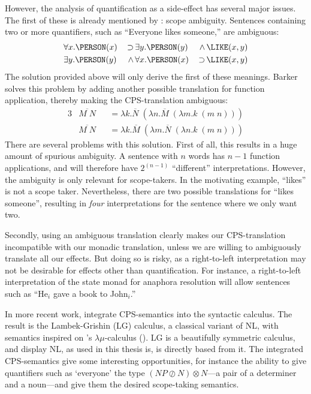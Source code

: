 However, the analysis of quantification as a side-effect has several
major issues. The first of these is already mentioned by
\citet{barker2004}: scope ambiguity. Sentences containing two or
more quantifiers, such as ``Everyone likes someone,'' are ambiguous:
\begin{alignat*}{3}
  &\forall x.\PERSON(x) \,&\supset \,&\exists y.\PERSON(y) \,&\wedge  \,&\LIKE(x,y)\\
  &\exists y.\PERSON(y) \,&\wedge  \,&\forall x.\PERSON(x) \,&\supset \,&\LIKE(x,y)
\end{alignat*}
The solution provided above will only derive the first of these
meanings. Barker solves this problem by adding another possible
translation for function application, thereby making the
CPS-translation ambiguous:
\begin{alignat*}{3}
  &\overline{M\;N} &&= \lambda k. \overline{N}\;(\lambda
  n.\overline{M}\;(\lambda m.k\;(m\;n)))\\
  &\overline{M\;N} &&= \lambda k. \overline{M}\;(\lambda
  m.\overline{N}\;(\lambda n.k\;(m\;n)))
\end{alignat*}
There are several problems with this solution. First of all, this
results in a huge amount of spurious ambiguity. A sentence with $n$
words has $n-1$ function applications, and will therefore have
$2^{(n-1)}$ ``different'' interpretations. However, the ambiguity is
only relevant for scope-takers. In the motivating example, ``likes''
is not a scope taker. Nevertheless, there are two possible
translations for ``likes someone'', resulting in \emph{four}
interpretations for the sentence where we only want two.

Secondly, using an ambiguous translation clearly makes our
CPS-translation incompatible with our monadic translation, unless we
are willing to ambiguously translate all our effects. But doing so is
risky, as a right-to-left interpretation may not be desirable for
effects other than quantification. For instance, a right-to-left
interpretation of the state monad for anaphora resolution will allow
sentences such as ``He$_i$ gave a book to John$_i$.''

\vspace*{1\baselineskip}

In more recent work, \citet{moortgat2012} integrate CPS-semantics into
the syntactic calculus. The result is the Lambek-Grishin (LG)
calculus, a classical variant of NL, with semantics inspired on
\citeauthor{parigot1992}'s $\lambda\mu$-calculus
(\citeyear{parigot1992}). LG is a beautifully symmetric calculus, and
display NL, as used in this thesis is, is directly based from it. The
integrated CPS-semantics give some interesting opportunities, for
instance the ability to give quantifiers such as `everyone' the type
$(NP\oslash N)\otimes N$---a pair of a determiner and a noun---and
give them the desired scope-taking semantics.

